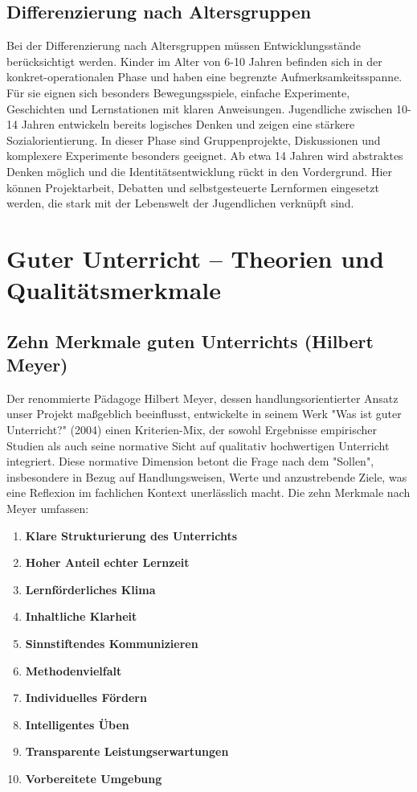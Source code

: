 \subsection{Differenzierung nach Altersgruppen}
Bei der Differenzierung nach Altersgruppen müssen Entwicklungsstände berücksichtigt werden. Kinder im Alter von 6-10 Jahren befinden sich in der konkret-operationalen Phase und haben eine begrenzte Aufmerksamkeitsspanne. Für sie eignen sich besonders Bewegungsspiele, einfache Experimente, Geschichten und Lernstationen mit klaren Anweisungen. Jugendliche zwischen 10-14 Jahren entwickeln bereits logisches Denken und zeigen eine stärkere Sozialorientierung. In dieser Phase sind Gruppenprojekte, Diskussionen und komplexere Experimente besonders geeignet. Ab etwa 14 Jahren wird abstraktes Denken möglich und die Identitätsentwicklung rückt in den Vordergrund. Hier können Projektarbeit, Debatten und selbstgesteuerte Lernformen eingesetzt werden, die stark mit der Lebenswelt der Jugendlichen verknüpft sind.
\section{Guter Unterricht – Theorien und Qualitätsmerkmale}
\subsection{Zehn Merkmale guten Unterrichts (Hilbert Meyer)}
Der renommierte Pädagoge Hilbert Meyer, dessen handlungsorientierter Ansatz unser Projekt maßgeblich beeinflusst, entwickelte in seinem Werk "Was ist guter Unterricht?" (2004) einen Kriterien-Mix, der sowohl Ergebnisse empirischer Studien als auch seine normative Sicht auf qualitativ hochwertigen Unterricht integriert. Diese normative Dimension betont die Frage nach dem "Sollen", insbesondere in Bezug auf Handlungsweisen, Werte und anzustrebende Ziele, was eine Reflexion im fachlichen Kontext unerlässlich macht. Die zehn Merkmale nach Meyer umfassen:
\begin{enumerate}
    \item \textbf{Klare Strukturierung des Unterrichts}
    \item \textbf{Hoher Anteil echter Lernzeit}
    \item \textbf{Lernförderliches Klima}
    \item \textbf{Inhaltliche Klarheit}
    \item \textbf{Sinnstiftendes Kommunizieren}
    \item \textbf{Methodenvielfalt}
    \item \textbf{Individuelles Fördern}
    \item \textbf{Intelligentes Üben}
    \item \textbf{Transparente Leistungserwartungen}
    \item \textbf{Vorbereitete Umgebung}
\end{enumerate}
